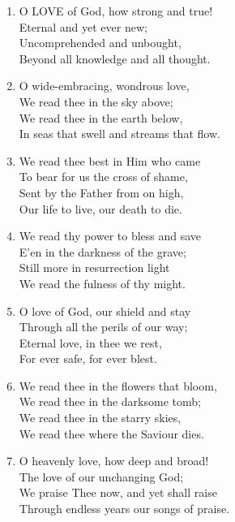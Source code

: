 \begin{enumerate}
    \item O LOVE of God, how strong and true! \\
        Eternal and yet ever new; \\
        Uncomprehended and unbought, \\
        Beyond all knowledge and all thought.

    \item O wide-embracing, wondrous love, \\
        We read thee in the sky above; \\
        We read thee in the earth below, \\
        In seas that swell and streams that flow.

    \item We read thee best in Him who came \\
        To bear for us the cross of shame, \\
        Sent by the Father from on high, \\
        Our life to live, our death to die.

    \item We read thy power to bless and save \\
        E'en in the darkness of the grave; \\
        Still more in resurrection light \\
        We read the fulness of thy might.

    \item O love of God, our shield and stay \\
        Through all the perils of our way; \\
        Eternal love, in thee we rest, \\
        For ever safe, for ever blest.

    \item We read thee in the flowers that bloom, \\
        We read thee in the darksome tomb; \\
        We read thee in the starry skies, \\
        We read thee where the Saviour dies.

    \item O heavenly love, how deep and broad! \\
        The love of our unchanging God; \\
        We praise Thee now, and yet shall raise \\
        Through endless years our songs of praise.

\end{enumerate}

